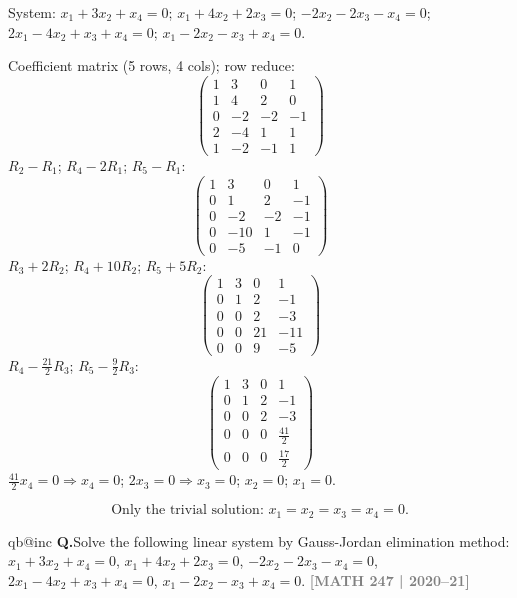 \documentclass[12pt,a3paper]{article}
\makeatletter
\newcommand{\yr}[1]{\hfill\textcolor{gray}{\small\textbf{[#1]}}}
\newcounter{qnum}
\newcommand{\Q}[1]{%
  \csname qb@inc\endcsname
  \needspace{4\baselineskip}
  \refstepcounter{qnum}
  \vspace{6pt}
  \noindent\textbf{Q\theqnum.}\enspace #1\par
}
\makeatother
\begin{document}
\begin{tcolorbox}[enhanced,breakable,
  colback=cB!4,colframe=cB,boxrule=0.8pt,arc=5pt,
  title={\textbf{Answer --- Homogeneous System: 5 Equations in 4 Variables}},
  fonttitle=\bfseries\color{white},colbacktitle=cB]

System: $x_1+3x_2+x_4=0$;\; $x_1+4x_2+2x_3=0$;\; $-2x_2-2x_3-x_4=0$;\; $2x_1-4x_2+x_3+x_4=0$;\; $x_1-2x_2-x_3+x_4=0$.

Coefficient matrix (5 rows, 4 cols); row reduce:
\[
\begin{pmatrix}1&3&0&1\\1&4&2&0\\0&-2&-2&-1\\2&-4&1&1\\1&-2&-1&1\end{pmatrix}
\]
$R_2-R_1$; $R_4-2R_1$; $R_5-R_1$:
\[
\begin{pmatrix}1&3&0&1\\0&1&2&-1\\0&-2&-2&-1\\0&-10&1&-1\\0&-5&-1&0\end{pmatrix}
\]
$R_3+2R_2$; $R_4+10R_2$; $R_5+5R_2$:
\[
\begin{pmatrix}1&3&0&1\\0&1&2&-1\\0&0&2&-3\\0&0&21&-11\\0&0&9&-5\end{pmatrix}
\]
$R_4-\frac{21}{2}R_3$; $R_5-\frac{9}{2}R_3$:
\[
\begin{pmatrix}1&3&0&1\\0&1&2&-1\\0&0&2&-3\\0&0&0&\frac{41}{2}\\0&0&0&\frac{17}{2}\end{pmatrix}
\]
$\frac{41}{2}x_4=0\Rightarrow x_4=0$; $2x_3=0\Rightarrow x_3=0$; $x_2=0$; $x_1=0$.

\[
\boxed{\text{Only the trivial solution: } x_1=x_2=x_3=x_4=0.}
\]

\end{tcolorbox}

\Q{Solve the following linear system by Gauss-Jordan elimination method:
$x_1 + 3x_2 + x_4 = 0$, $x_1 + 4x_2 + 2x_3 = 0$, $-2x_2 - 2x_3 - x_4 = 0$, $2x_1 - 4x_2 + x_3 + x_4 = 0$, $x_1 - 2x_2 - x_3 + x_4 = 0$.
\yr{MATH 247 | 2020--21}}
\end{document}
